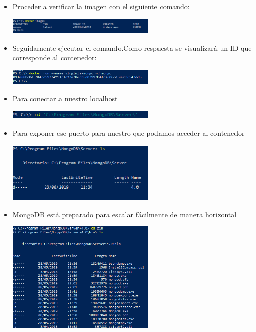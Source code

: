 \documentclass[%
 reprint,
 amsmath,amssymb,
 aps,
]{revtex4-1}
\begin{document}
\begin{itemize}
\begin{center}
		\end{center}	
                     \item Proceder a verificar la imagen con el siguiente comando:
                     \begin{center}
		\includegraphics[width=7cm]{./Imagenes/15}
		\end{center}	
                     \item Seguidamente ejecutar el comando.Como respuesta se visualizará un ID que corresponde al contenedor:
                     \begin{center}
		\includegraphics[width=7cm]{./Imagenes/16}
		\end{center}	
                     \item Para conectar  a nuestro localhost 
                     \begin{center}
		\includegraphics[width=7cm]{./Imagenes/17}
		\end{center}	
                     \item Para exponer ese puerto para nuestro que podamos  acceder al contenedor
                     \begin{center}
		\includegraphics[width=7cm]{./Imagenes/18}
		\end{center}	
                     \item MongoDB está preparado para escalar fácilmente de manera horizontal
                     \begin{center}
		\includegraphics[width=7cm]{./Imagenes/20}

\end{center}
\end{itemize}
\end{document}

